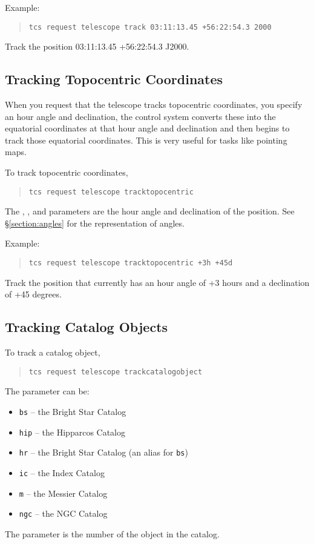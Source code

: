 Example:

\begin{quote}
\verb|tcs request telescope track 03:11:13.45 +56:22:54.3 2000|
\end{quote}
Track the position 03:11:13.45 +56:22:54.3 J2000.

\subsection{Tracking Topocentric Coordinates}

When you request that the telescope tracks topocentric coordinates, you specify an hour angle and declination, the control system converts these into the equatorial coordinates at that hour angle and declination and then begins to track those equatorial coordinates. This is very useful for tasks like pointing maps.

To track topocentric coordinates,
\begin{quote}
\verb|tcs request telescope tracktopocentric|  
\end{quote}
The , , and  parameters are the hour angle and declination of the position. See \S\ref{section:angles} for the representation of angles.

Example:

\begin{quote}
\verb|tcs request telescope tracktopocentric +3h +45d|
\end{quote}
Track the position that currently has an hour angle of +3 hours and a declination of +45 degrees.

\subsection{Tracking Catalog Objects}

To track a catalog object,
\begin{quote}
\verb|tcs request telescope trackcatalogobject|  
\end{quote}
The  parameter can be:
\begin{itemize}
\item \verb|bs| -- the Bright Star Catalog
\item \verb|hip| -- the Hipparcos Catalog
\item \verb|hr| -- the Bright Star Catalog (an alias for \verb|bs|)
\item \verb|ic| -- the Index Catalog
\item \verb|m| -- the Messier Catalog
\item \verb|ngc| -- the NGC Catalog
\end{itemize}
The  parameter is the number of the object in the catalog.

